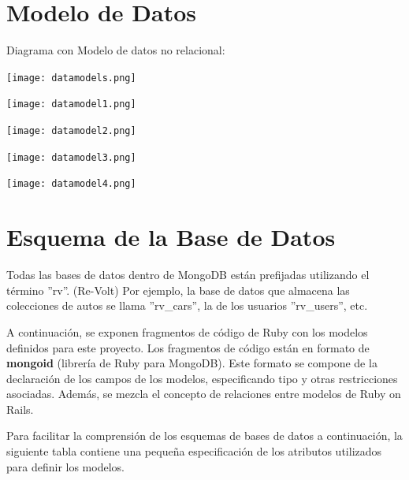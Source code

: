 \section{Modelo de Datos}
Diagrama con Modelo de datos no relacional:

\begin{center}
  \texttt{[image: datamodels.png]}
\end{center}

\begin{center}
	\texttt{[image: datamodel1.png]}
\end{center}

\begin{center}
	\texttt{[image: datamodel2.png]}
\end{center}

\begin{center}
	\texttt{[image: datamodel3.png]}
\end{center}

\begin{center}
	\texttt{[image: datamodel4.png]}
\end{center}

\section{Esquema de la Base de Datos}
Todas las bases de datos dentro de MongoDB están prefijadas utilizando el término ''rv''. (Re-Volt) Por ejemplo, la base de datos que almacena las colecciones de autos se llama ''rv\_cars'', la de los usuarios ''rv\_users'', etc.

A continuación, se exponen fragmentos de código de Ruby con los modelos definidos para este proyecto. Los fragmentos de código están en formato de \textbf{mongoid} (librería de Ruby para MongoDB). Este formato se compone de la declaración de los campos de los modelos, especificando tipo y otras restricciones asociadas. Además, se mezcla el concepto de relaciones entre modelos de Ruby on Rails.

Para facilitar la comprensión de los esquemas de bases de datos a continuación, la siguiente tabla contiene una pequeña especificación de los atributos utilizados para definir los modelos.

